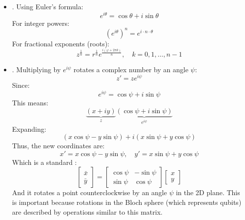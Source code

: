 \begin{itemize}
    \item {}. Using Euler's formula:
    \begin{equation*}
        e^{i\theta} = \cos \theta + i \sin \theta
    \end{equation*}
    For integer powers:
    \begin{equation*}
        (e^{i\theta})^n = e^{i \cdot n \cdot \theta}
    \end{equation*}
    For fractional exponents (roots):
    \begin{equation*}
        z^{\frac{1}{n}} = r^{\frac{1}{n}} e^{\frac{i\left(\varphi+2\pi k\right)}{n}}, \quad k = 0, 1, \dots, n-1
    \end{equation*}

    \item {}. Multiplying by $e^{i\psi}$ rotates a complex number by an angle $\psi$:
    \begin{equation*}
        z' = z e^{i\psi}
    \end{equation*}
    Since:
    \begin{equation*}
        e^{i\psi} = \cos \psi + i \sin \psi
    \end{equation*}
    This means:
    \begin{equation*}
        \underbrace{\left(x + iy\right)}_{z}\underbrace{\left(\cos \psi + i \sin \psi\right)}_{e^{i\psi}}
    \end{equation*}
    Expanding:
    \begin{equation*}
        (x\cos \psi - y\sin \psi) + i (x\sin \psi + y\cos \psi)  
    \end{equation*}
    Thus, the new coordinates are:
    \begin{equation*}
        x' = x\cos \psi - y\sin \psi, \quad y' = x\sin \psi + y\cos \psi    
    \end{equation*}
    Which is a standard :
    \begin{equation*}
        \begin{bmatrix}
            \bar{x} \\ \bar{y}
        \end{bmatrix}
        =
        \begin{bmatrix}
            \cos\psi & -\sin\psi \\
            \sin\psi & \cos\psi
        \end{bmatrix}
        \begin{bmatrix}
            x \\ y
        \end{bmatrix}
    \end{equation*}
    And it rotates a point counterclockwise by an angle $\psi$ in the 2D plane. This is important because rotations in the Bloch sphere (which represents qubits) are described by operations similar to this matrix.
    

\end{itemize}
